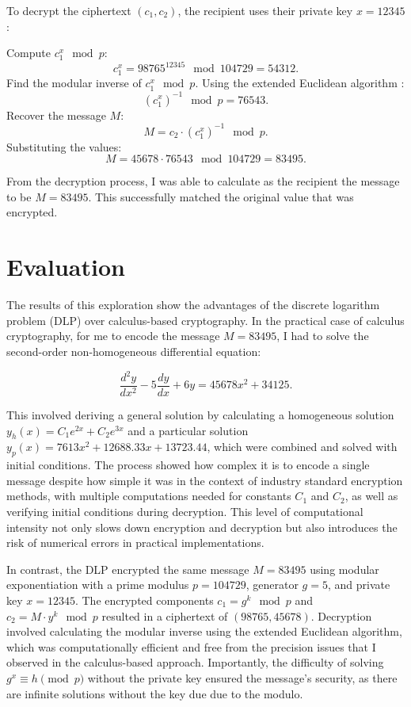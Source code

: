 \documentclass[12pt]{article}
\begin{document}
To decrypt the ciphertext \( (c_1, c_2) \), the recipient uses their private key \( x = 12345 \):

\centering Compute \( c_1^x \mod p \):
\[
c_1^x = 98765^{12345} \mod 104729 = 54312.
\]
Find the modular inverse of \( c_1^x \mod p \). Using the extended Euclidean algorithm \cite{ModularInverse}:
\[
(c_1^x)^{-1} \mod p = 76543.
\]
Recover the message \( M \):
\[
M = c_2 \cdot (c_1^x)^{-1} \mod p.
\]
Substituting the values:
\[
M = 45678 \cdot 76543 \mod 104729 = 83495.
\]

\raggedright
\setlength{\parindent}{0.5in} %

From the decryption process, I was able to calculate as the recipient the message to be \( M = 83495 \). This successfully matched the original value that was encrypted.






\section*{Evaluation}

The results of this exploration show the advantages of the discrete logarithm problem (DLP) over calculus-based cryptography. In the practical case of calculus cryptography, for me to encode the message \( M = 83495 \), I had to solve the second-order non-homogeneous differential equation:

\[
\frac{d^2y}{dx^2} - 5\frac{dy}{dx} + 6y = 45678x^2 + 34125.
\]

This involved deriving a general solution by calculating a homogeneous solution \( y_h(x) = C_1e^{2x} + C_2e^{3x} \) and a particular solution \( y_p(x) = 7613x^2 + 12688.33x + 13723.44 \), which were combined and solved with initial conditions. The process showed how complex it is to encode a single message despite how simple it was in the context of industry standard encryption methods, with multiple computations needed for constants \( C_1 \) and \( C_2 \), as well as verifying initial conditions during decryption. This level of computational intensity not only slows down encryption and decryption but also introduces the risk of numerical errors in practical implementations.

In contrast, the DLP encrypted the same message \( M = 83495 \) using modular exponentiation with a prime modulus \( p = 104729 \), generator \( g = 5 \), and private key \( x = 12345 \). The encrypted components \( c_1 = g^k \mod p \) and \( c_2 = M \cdot y^k \mod p \) resulted in a ciphertext of \( (98765, 45678) \). Decryption involved calculating the modular inverse using the extended Euclidean algorithm, which was computationally efficient and free from the precision issues that I observed in the calculus-based approach. Importantly, the difficulty of solving \( g^x \equiv h \pmod{p} \) without the private key ensured the message's security, as there are infinite solutions without the key due due to the modulo.
\end{document}
